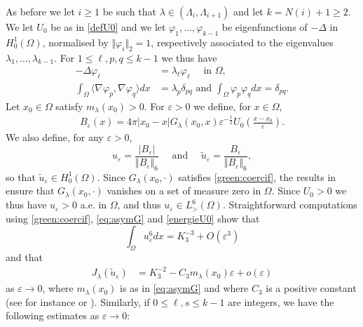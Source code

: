 \documentclass[10pt]{amsart}
\numberwithin{equation}{section}
\newcommand{\ve}{\varepsilon}
\newcommand{\vp}{\varphi}
\newcommand{\Om}{\Omega}
\theoremstyle{plain}
\theoremstyle{remark}
\begin{document}
As before we let $i \ge1$ be such that $\lambda \in (\Lambda_i, \Lambda_{i+1})$ and let $k = N(i)+1 \ge 2$. We let $U_0$ be as in \eqref{defU0} and we let $\vp_1, \dots, \vp_{k-1}$ be eigenfunctions of $-\Delta$ in $H^1_0(\Omega)$, normalised by $\Vert \vp_i \Vert_2 = 1$, respectively associated to the eigenvalues $\lambda_1, \dots, \lambda_{k-1}$. For $1 \le \ell,p,q \le k-1$ we thus have 
 \begin{equation} \label{norma1} 
 \begin{aligned}   
 - \Delta \vp_\ell & =  \lambda_\ell \vp_\ell \quad \text{ in } \Om, \\
  	\int_{\Om} \langle \nabla \vp_p, \nabla \vp_q \rangle dx & = \lambda_p \delta_{pq} \text{ and }  \int_\Om \varphi_{p} \varphi_{q} dx =  \delta_{pq}.
 \end{aligned} 
 \end{equation}
Let $x_0 \in \Omega$ satisfy $m_\lambda(x_0) >0$. For $\ve >0$ we define, for $x \in \Omega$,
\begin{equation*} 
\begin{aligned}
	B_{\ve}(x)	= 4 \pi |x_0-x|  G_\lambda(x_0, x) \ve^{- \frac12} U_0\left( \frac{x-x_0}{\ve}\right).
	\end{aligned} 
	\end{equation*}
We also define, for any $\ve >0$,
  \begin{equation} \label{def:ueps}
 u_\ve = \frac{|B_{\ve}|}{\Vert B_{\ve} \Vert_{6}} \quad \text{ and } \quad  \tilde{u}_\ve = \frac{B_{\ve}}{\Vert B_{\ve} \Vert_{6}} ,
   \end{equation} 
so that $\tilde{u}_\ve \in H^1_0(\Om)$. Since $G_\lambda(x_0, \cdot)$ satisfies \eqref{green:coercif}, the results in \cite{HardtSimon} ensure that $G_\lambda(x_0, \cdot)$ vanishes on a set of measure zero in $\Omega$. Since $U_0 >0$ we thus have $u_\ve >0$ a.e. in $\Om$, and thus $u_{\ve}\in L^{6}_>(\Om)$. Straightforward computations using \eqref{green:coercif}, \eqref{eq:asymG} and \eqref{energieU0} show that
\begin{equation} \label{DLnormeB}
\int_{\Om} u_{\ve}^{6}dx = K_3^{-3} + O(\ve^3)
\end{equation} 
and that 
\begin{equation}\label{eq:Jlambdauepx03}
\begin{aligned}
		J_{\lambda}(\tilde{u}_{\ve})& =K_3^{-2} - C_3 m_\lambda(x_0) \ve  + o(\ve) 
\end{aligned} 
	\end{equation}
as $\ve \to 0$, where $m_\lambda(x_0)$ is as in \eqref{eq:asymG} and where $C_3$ is a positive constant (see for instance \cite{SchoenYamabe} or \cite{EspositoPistoiaVetois}). Similarly, if $0 \le \ell,s \le k-1$ are integers, we have the following estimates as $\ve \to 0$: 
\end{document}
